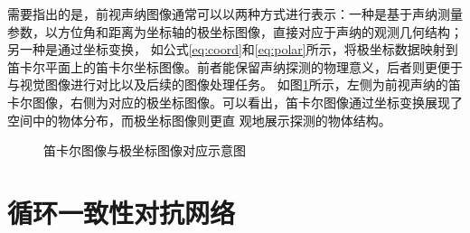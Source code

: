 需要指出的是，前视声纳图像通常可以以两种方式进行表示：一种是基于声纳测量参数，以方位角和距离为坐标轴的极坐标图像，直接对应于声纳的观测几何结构；另一种是通过坐标变换，
如公式\eqref{eq:coord}和\eqref{eq:polar}所示，将极坐标数据映射到笛卡尔平面上的笛卡尔坐标图像。前者能保留声纳探测的物理意义，后者则更便于与视觉图像进行对比以及后续的图像处理任务。
如图\ref{fig:笛卡尔与极坐标图像对应示意图}所示，左侧为前视声纳的笛卡尔图像，右侧为对应的极坐标图像。可以看出，笛卡尔图像通过坐标变换展现了空间中的物体分布，而极坐标图像则更直
观地展示探测的物体结构。

\begin{figure}[!ht]
	\centering
	\newsavebox{\leftpic}


	\caption{笛卡尔图像与极坐标图像对应示意图}
	\label{fig:笛卡尔与极坐标图像对应示意图}
\end{figure}


\section{循环一致性对抗网络}

